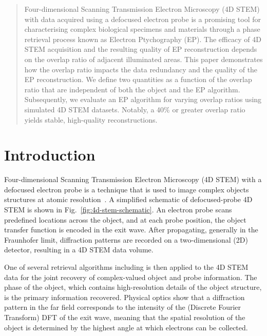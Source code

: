 \documentclass[11pt,draftclsnofoot,onecolumn]{IEEEtran}
\begin{document}

\begin{abstract}
Four-dimensional Scanning Transmission Electron Microscopy (4D STEM) with data acquired using a defocused electron probe is a promising tool for characterising complex biological specimens and materials through a phase retrieval process known as Electron Ptychography (EP). The efficacy of 4D STEM acquisition and the resulting quality of EP reconstruction depends on the overlap ratio of adjacent illuminated areas. This paper demonstrates how the overlap ratio impacts the data redundancy and the quality of the EP reconstruction. We define two quantities as a function of the overlap ratio that are independent of both the object and the EP algorithm. Subsequently, we evaluate an EP algorithm for varying overlap ratios using simulated 4D STEM datasets. Notably, a 40\% or greater overlap ratio yields stable, high-quality reconstructions.
\end{abstract}
{}
\section{Introduction}\label{sec:introduction}
Four-dimensional Scanning Transmission Electron Microscopy (4D STEM) with a defocused electron probe is a technique that is used to image complex objects structures at atomic resolution~\cite{nellist1995resolution}.
A simplified schematic of defocused-probe 4D STEM is shown in Fig.~\ref{fig:4d-stem-schematic}. An electron probe scans predefined locations across the object, and at each probe position, the object transfer function is encoded in the exit wave. After propagating, \eg generally in the Fraunhofer limit, diffraction patterns are recorded on a two-dimensional (2D) detector, resulting in a 4D STEM data volume.

One of several retrieval algorithms  including \cite{rodenburg2004phase,maiden2009improved,thibault2009probe,luke2004relaxed,pham2019semi,thibault2012maximum,moshtaghpour2023exploring,moshtaghpour2024lorepie} is then applied to the 4D STEM data for the joint recovery of complex-valued object and probe information. The phase of the object, which contains high-resolution details of the object structure, is the primary information recovered. Physical optics show that a diffraction pattern in the far field corresponds to the intensity of the (Discrete Fourier Transform) DFT of the exit wave, meaning that the spatial resolution of the object is determined by the highest angle at which electrons can be collected.
\end{document}
